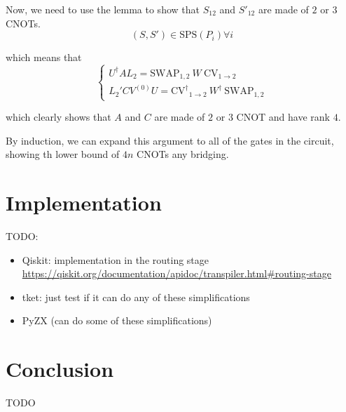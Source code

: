 \documentclass{report}
\begin{document}
Now, we need to use the lemma to show that $S_{12}$ and $S'_{12}$ are made of $2$ or $3$ CNOTs.
\begin{equation}
  (S, S') \in \mathrm{SPS}(P_i) \forall i
\end{equation}
  
which means that
\begin{equation}
  \begin{cases} U^\dagger AL_2 = \mathrm{SWAP}_{1,2} ~ W ~ \mathrm{CV}_{1\to 2} \\
    L_2' C V^{(0)} U = \mathrm{CV^\dagger}_{1\to 2} ~ W^\dagger ~ \mathrm{SWAP}_{1,2}
  \end{cases}
\end{equation}

which clearly shows that $A$ and $C$ are made of $2$ or $3$ CNOT and have rank $4$.

By induction, we can expand this argument to all of the gates in the circuit, showing th lower bound of $4n$ CNOTs any bridging.


\chapter{Implementation}\label{chap:implementation}

TODO:
\begin{itemize}
  \item Qiskit: implementation in the routing stage \url{https://qiskit.org/documentation/apidoc/transpiler.html#routing-stage}
  \item tket: just test if it can do any of these simplifications
  \item PyZX (can do some of these simplifications)
\end{itemize}

\chapter{Conclusion}\label{chap:conclusion}

TODO

\printbibliography
\end{document}
